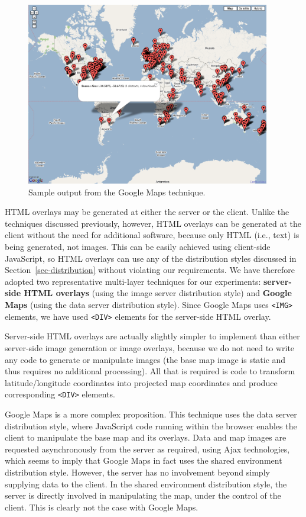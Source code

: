 \documentclass[acmtocl,acmnow]{acmtrans2m}
\begin{document}
\begin{figure}
	\centering
	\includegraphics[width=0.95\textwidth,keepaspectratio]{GoogleMap-full.png}
	\caption{Sample output from the Google Maps technique.}
	\label{fig-google}
\end{figure}


HTML overlays may be generated at either the server or the client.
Unlike the techniques discussed previously, however, HTML overlays can
be generated at the client without the need for additional software,
because only HTML (i.e., text) is being generated, not images. This can
be easily achieved using client-side JavaScript, so HTML overlays can
use any of the distribution styles discussed in
Section~\ref{sec-distribution} without violating our requirements. We
have therefore adopted two representative multi-layer techniques for our
experiments: \textbf{server-side HTML overlays} (using the image server
distribution style) and \textbf{Google Maps} (using the data server
distribution style). Since Google Maps uses \verb|<IMG>| elements, we
have used \verb|<DIV>| elements for the server-side HTML overlay.

Server-side HTML overlays are actually slightly simpler to implement
than either server-side image generation or image overlays, because we
do not need to write any code to generate or manipulate images (the base
map image is static and thus requires no additional processing). All
that is required is code to transform latitude/longitude coordinates
into projected map coordinates and produce corresponding \verb|<DIV>|
elements.

Google Maps \cite{Goog-M-2006-maps} is a more complex proposition. This
technique uses the data server distribution style, where JavaScript code
running within the browser enables the client to manipulate the base map
and its overlays. Data and map images are requested asynchronously from
the server as required, using Ajax technologies, which seems to imply
that Google Maps in fact uses the shared environment distribution style.
However, the server has no involvement beyond simply supplying data to
the client. In the shared environment distribution style, the server is
directly involved in manipulating the map, under the control of the
client. This is clearly not the case with Google Maps.
\end{document}
